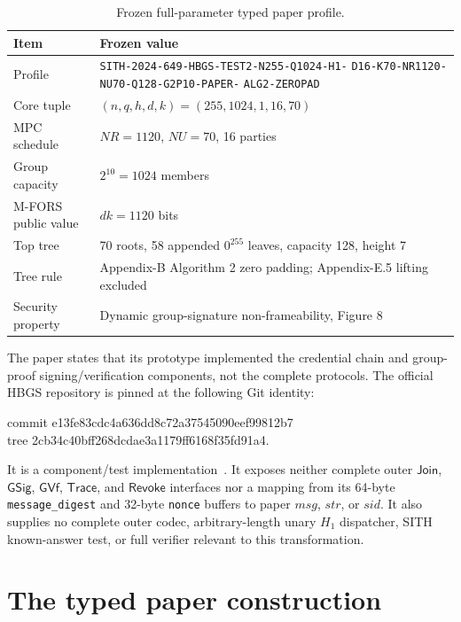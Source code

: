 \documentclass[10pt,a4paper]{article}
\newcommand{\Hone}{H_1}
\newcommand{\sid}{\mathit{sid}}
\newcommand{\strr}{\mathit{str}}
\newcommand{\msg}{\mathit{msg}}
\newcommand{\GVf}{\mathsf{GVf}}
\newcommand{\GSig}{\mathsf{GSig}}
\newcommand{\Trace}{\mathsf{Trace}}
\begin{document}
\begin{table}[h]
\centering
\small
\begin{tabularx}{\textwidth}{@{}lX@{}}
\toprule
Item & Frozen value \\
\midrule
Profile & \texttt{SITH-2024-649-HBGS-TEST2-N255-Q1024-H1-}\newline
\texttt{D16-K70-NR1120-NU70-Q128-G2P10-PAPER-}\newline
\texttt{ALG2-ZEROPAD} \\
Core tuple & $(n,q,h,d,k)=(255,1024,1,16,70)$ \\
MPC schedule & $NR=1120$, $NU=70$, 16 parties \\
Group capacity & $2^{10}=1024$ members \\
M-FORS public value & $d k=1120$ bits \\
Top tree & 70 roots, 58 appended $0^{255}$ leaves, capacity 128, height 7 \\
Tree rule & Appendix-B Algorithm 2 zero padding; Appendix-E.5 lifting excluded \\
Security property & Dynamic group-signature non-frameability, Figure 8 \\
\bottomrule
\end{tabularx}
\caption{Frozen full-parameter typed paper profile.}
\label{tab:profile}
\end{table}

The paper states that its prototype implemented the credential chain and
group-proof signing/verification components, not the complete protocols.
The official HBGS repository is pinned at the following Git identity:
\begin{center}
\small\ttfamily
commit e13fe83cdc4a636dd8c72a37545090eef99812b7\\
tree 2cb34c40bff268dcdae3a1179ff6168f35fd91a4.
\end{center}
It is a component/test implementation~\cite{hbgs}. It exposes neither complete
outer $\mathsf{Join}$, $\GSig$, $\GVf$, $\Trace$, and $\mathsf{Revoke}$
interfaces nor a mapping from
its 64-byte \texttt{message\_digest} and 32-byte \texttt{nonce} buffers to
paper $\msg$, $\strr$, or $\sid$. It also supplies no complete outer codec,
arbitrary-length unary $\Hone$ dispatcher, SITH known-answer test, or full
verifier relevant to this transformation.

\section{The typed paper construction}
\end{document}

